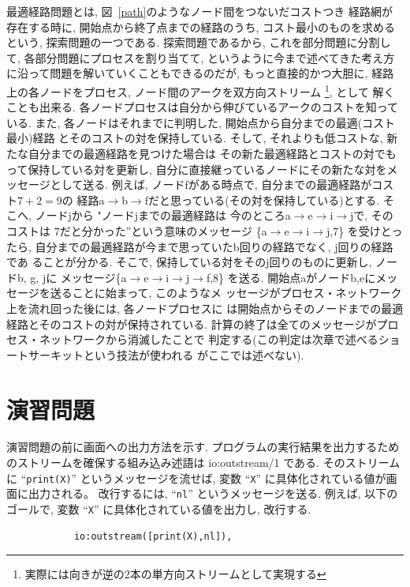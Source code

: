 \documentclass[a4,titlepage]{jsreport}
\newenvironment{program}{\begin{quote}}{\end{quote}}
\begin{document}
最適経路問題とは, 図~\ref{path}のようなノード間をつないだコストつき
経路網が存在する時に, 開始点から終了点までの経路のうち, 
コスト最小のものを求めるという, 探索問題の一つである.  
探索問題であるから, これを部分問題に分割して, 
各部分問題にプロセスを割り当てて, というように今まで述べてきた考え方
に沿って問題を解いていくこともできるのだが, もっと直接的かつ大胆に, 
経路上の各ノードをプロセス, ノード間のアークを双方向ストリーム
\footnote{実際には向きが逆の2本の単方向ストリームとして実現する}, として
解くことも出来る.  
各ノードプロセスは自分から伸びているアークのコストを知っている.  
また, 各ノードはそれまでに判明した, 開始点から自分までの最適(コスト最小)経路
とそのコストの対を保持している.  
そして, それよりも低コストな, 新たな自分までの最適経路を見つけた場合は
その新た最適経路とコストの対でもって保持している対を更新し, 
自分に直接継っているノードにその新たな対をメッセージとして送る.  
例えば, ノードfがある時点で, 自分までの最適経路がコスト$7+2=9$の
経路a$\rightarrow$b$\rightarrow$fだと思っている(その対を保持している)とする.  
そこへ, ノードjから "ノードjまでの最適経路は
今のところa$\rightarrow$e$\rightarrow$i$\rightarrow$jで, そのコストは
$7$だと分かった”という意味のメッセージ 
\{a$\rightarrow$e$\rightarrow$i$\rightarrow$j,7\} を受けとったら, 
自分までの最適経路が今まで思っていたb回りの経路でなく, j回りの経路であ
ることが分かる.  そこで, 保持している対をそのj回りのものに更新し, 
ノードb, g, jに
メッセージ\{a$\rightarrow$e$\rightarrow$i$\rightarrow$j$\rightarrow$f,8\}
を送る.  開始点aがノードb,eにメッセージを送ることに始まって, このようなメ
ッセージがプロセス・ネットワーク上を流れ回った後には, 各ノードプロセスに
は開始点からそのノードまでの最適経路とそのコストの対が保持されている.  
計算の終了は全てのメッセージがプロセス・ネットワークから消滅したことで
判定する(この判定は次章で述べるショートサーキットという技法が使われる
がここでは述べない).  

\section{演習問題}
演習問題の前に画面への出力方法を示す.  
プログラムの実行結果を出力するためのストリームを確保する組み込み述語は
io:outstream/1 である.  
そのストリームに ``\verb!print(X)!'' というメッセージを流せば, 
変数 ``\verb!X!'' に具体化されている値が画面に出力される。
改行するには, ``\verb!nl!'' というメッセージを送る.
例えば, 以下のゴールで, 変数 ``\verb!X!'' に具体化されている値を出力し, 
改行する. 

\begin{verbatim}
            io:outstream([print(X),nl]),
\end{verbatim}
\end{document}
